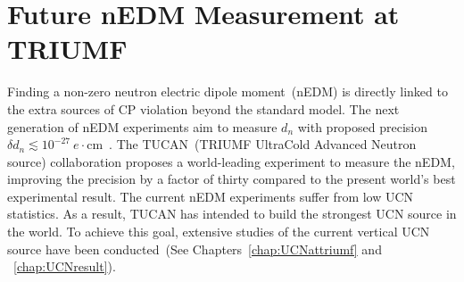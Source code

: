 \chapter{Future nEDM Measurement at TRIUMF\label{chap:nedm}}

Finding a non-zero neutron electric dipole moment~(nEDM) is directly
linked to the extra sources of CP violation beyond the standard model.
The next generation of nEDM experiments aim to measure $d_n$ with
proposed precision
$\delta d_n\lesssim
10^{-27}~e\cdot$cm~\cite{serebrov2014new,serebrov2011supersource,Kirch_talk,baker2011search,altarev2012next,golub1994neutron,ito2007plans,picker2017minuscule}.
The TUCAN~(TRIUMF UltraCold Advanced Neutron source) collaboration
proposes a world-leading experiment to measure the nEDM, improving the
precision by a factor of thirty compared to the present world’s best
experimental result. The current nEDM experiments suffer from low UCN
statistics. As a result, TUCAN has intended to build the strongest UCN
source in the world. To achieve this goal, extensive studies of the
current vertical UCN source have been conducted~(See
Chapters~\ref{chap:UCNattriumf} and ~\ref{chap:UCNresult}).

